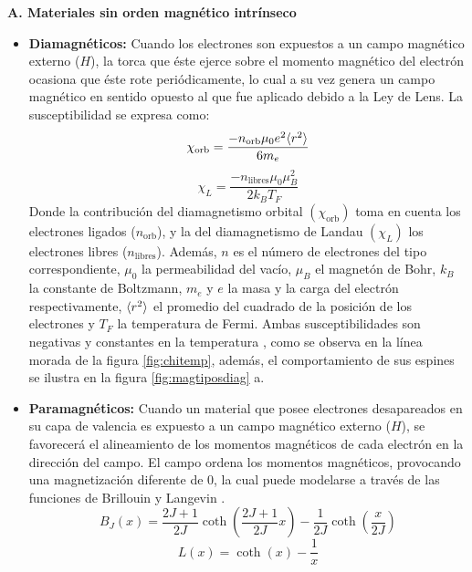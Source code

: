 \documentclass[../main.tex]{subfiles}
\begin{document}
\textbf{A. Materiales sin orden magnético intrínseco}
\begin{itemize}
    \item \textbf{Diamagnéticos:} Cuando los electrones son expuestos a un campo magnético externo ($H$), la torca que éste ejerce sobre el momento magnético del electrón ocasiona que éste rote periódicamente, lo cual a su vez genera un campo magnético en sentido opuesto al que fue aplicado debido a la Ley de Lens. La susceptibilidad se expresa como:
    \begin{equation}
        \chi_{\text{orb}}=\dfrac{-n_{\text{orb}}\mu_0e^2\langle r^2 \rangle}{6m_e}
        \label{eq:chidiamagorb}
    \end{equation}
    \begin{equation}
        \chi_L=\dfrac{-n_\text{libres}\mu_0\mu_B^2}{2k_BT_F}
        \label{eq:chidiamaglandau}
    \end{equation}
    Donde la contribución del diamagnetismo orbital $(\chi_\text{orb})$ toma en cuenta los electrones ligados ($n_\text{orb}$), y la del diamagnetismo de Landau $(\chi_L)$ los electrones libres ($n_\text{libres}$). Además, $n$ es el número de electrones del tipo correspondiente, $\mu_0$ la permeabilidad del vacío, $\mu_B$ el magnetón de Bohr, $k_B$ la constante de Boltzmann, $m_e$ y $e$ la masa y la carga del electrón respectivamente, $\langle r^2 \rangle$ el promedio del cuadrado de la posición de los electrones y $T_F$ la temperatura de Fermi. Ambas susceptibilidades son negativas y constantes en la temperatura \cite{coey2010magnetism}, como se observa en la línea morada de la figura \ref{fig:chitemp}, además, el comportamiento de sus espines se ilustra en la figura \ref{fig:magtiposdiag} a.
    \item \textbf{Paramagnéticos:} Cuando un material que posee electrones desapareados en su capa de valencia es expuesto a un campo magnético externo ($H$), se favorecerá el alineamiento de los momentos magnéticos de cada electrón en la dirección del campo. El campo ordena los momentos magnéticos, provocando una magnetización diferente de 0, la cual puede modelarse a través de las funciones de Brillouin y Langevin \cite{coey2010magnetism}.
    \begin{equation}
        B_J(x)=\dfrac{2J+1}{2J}\coth\left(\dfrac{2J+1}{2J}x\right)-\dfrac{1}{2J}\coth\left(\dfrac{x}{2J}\right)
        \label{eq:Brillouin}
    \end{equation}
    \begin{equation}
        L(x)=\coth(x)-\dfrac{1}{x}
        \label{eq:Langevin}

\end{equation}
\end{itemize}
\end{document}
